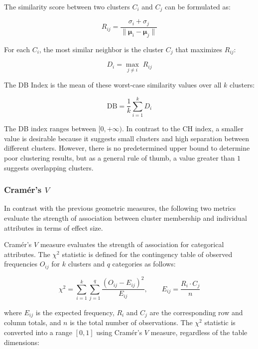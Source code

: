 The similarity score between two clusters $C_i$ and $C_j$ can be formulated as:

\begin{equation}
    R_{ij} = \frac{\sigma_i + \sigma_j}{\|\boldsymbol{\mu}_i - \boldsymbol{\mu}_j\|}
    \label{eq:db_Rij}
\end{equation}

For each $C_i$, the most similar neighbor is the cluster $C_j$ that maximizes $R_{ij}$:

\begin{equation}
    D_i = \max_{j \neq i}\; R_{ij}
    \label{eq:db_Di}
\end{equation}

The DB Index is the mean of these worst-case similarity values over all $k$ clusters:

\begin{equation}
    \mathrm{DB} = \frac{1}{k} \sum_{i=1}^{k} D_i
    \label{eq:db}
\end{equation}

\clearpage

The DB index ranges between $[0, +\infty)$. In contrast to the CH index, a smaller value is desirable because it suggests small clusters and high separation between different clusters. However, there is no predetermined upper bound to determine poor clustering results, but as a general rule of thumb, a value greater than $1$ suggests overlapping clusters.

\subsubsection*{Cramér's $V$}

In contrast with the previous geometric measures, the following two metrics evaluate the strength of association between cluster membership and individual attributes in terms of effect size.

Cramér’s $V$ measure \cite{cramer1946} evaluates the strength of association for categorical attributes. The $\chi^2$ statistic is defined for the contingency table of observed frequencies $O_{ij}$ for $k$ clusters and $q$ categories as follows:

\begin{equation}
    \chi^2 = \sum_{i=1}^{k} \sum_{j=1}^{q} \frac{(O_{ij} - E_{ij})^2}{E_{ij}}, \qquad E_{ij} = \frac{R_i \cdot C_j}{n}
    \label{eq:chisq}
\end{equation}

where $E_{ij}$ is the expected frequency, $R_i$ and $C_j$ are the corresponding row and column totals, and $n$ is the total number of observations. The $\chi^2$ statistic is converted into a range $[0, 1]$ using Cramér’s $V$ measure, regardless of the table dimensions:

